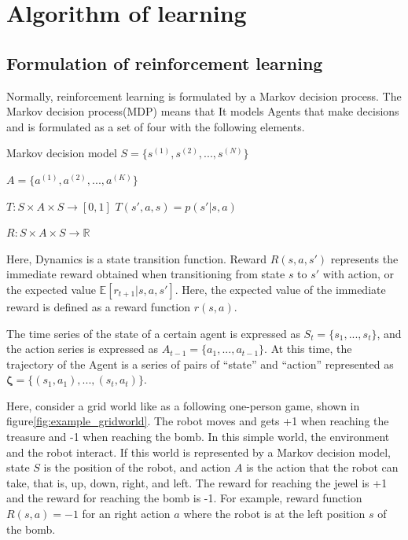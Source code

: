 \pagebreak
\chapter{Algorithm of learning}
\label{chapter:Algorithm}

\section{Formulation of reinforcement learning}


Normally, reinforcement learning is formulated by a Markov decision process. The Markov decision process(MDP) means that
It models Agents that make decisions and is formulated as a set of four with the following elements.
\begin{itembox}[l]{Markov decision model}
 \hspace{1.2cm} $S = \{ s^{(1)}, s^{(2)}, ... , s^{(N)} \}$

 \hspace{1cm} $A = \{ a^{(1)}, a^{(2)}, ... , a^{(K)} \}$ 

 \hspace{5mm} $T : S \times A \times S \rightarrow [0, 1]$ \hspace{1cm} $T(s',a,s) = p(s' | s,a)$

 \hspace{0.9cm} $R : S \times A \times S \rightarrow \mathbb{R}$
\end{itembox}

Here, Dynamics is a state transition function.
Reward $R(s, a, s')$ represents the immediate reward obtained when transitioning from state $s$ to $s′$ with action, or the expected value $\mathbb{E}[r_{t+1}|s,a,s']$.
Here, the expected value of the immediate reward is defined as a reward function $r(s, a)$.

The time series of the state of a certain agent is expressed as $S_t = \{s_1, ... , s_t \}$, and the action series is expressed as $A_{t-1} = \{ a_1, ..., a_{t-1} \}$.
At this time, the trajectory of the Agent is a series of pairs of “state” and “action” represented as $\bm{\zeta} = \{ (s_1, a_1), ... , (s_t, a_t) \}$.

Here, consider a grid world like as a following one-person game,  shown in figure\ref{fig:example_gridworld}. The robot moves and gets +1 when reaching the treasure and -1 when reaching the bomb.
In this simple world, the environment and the robot interact. If this world is represented by a Markov decision model, state $S$ is the position of the robot, and action $A$ is the action that the robot can take, that is, up, down, right, and left.
The reward for reaching the jewel is +1 and the reward for reaching the bomb is -1.
For example, reward function $R(s, a) = -1$ for an right action $a$  where the robot is at the left position $s$ of the bomb.


